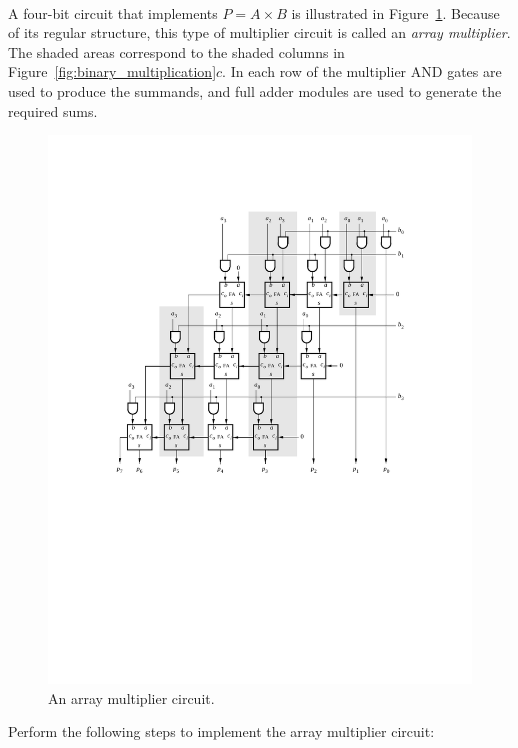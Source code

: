 \documentclass[epsfig,10pt,fullpage]{article}
\begin{document}
~\\
A four-bit circuit that implements $P = A \times B$ is illustrated in Figure~\ref{fig:array_mult}. Because of its
regular structure, this type of multiplier circuit is called an {\it array multiplier}. The shaded areas correspond to the shaded columns in Figure~\ref{fig:binary_multiplication}$c$. In each row of the multiplier AND gates are used to produce the summands,
and full adder modules are used to generate the required sums.

\begin{figure}[htb]
	\begin{center}
		\includegraphics[]{figures/figure4.pdf}
	\end{center}
	\caption{An array multiplier circuit.}
	\label{fig:array_mult}
\end{figure}

Perform the following steps to implement the array multiplier circuit:
\end{document}
